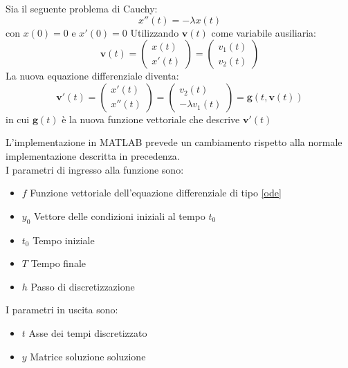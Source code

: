 \begin{example}
	Sia il seguente problema di Cauchy:
	\begin{equation*}
		x''(t) = -\lambda x(t)
	\end{equation*}
	con $x(0) = 0$ e $x'(0) = 0$
	Utilizzando $\textbf{v}(t)$ come variabile ausiliaria:
	\begin{equation*}
		\textbf{v}(t) = \begin{pmatrix}
			x(t) \\ x'(t)
		\end{pmatrix}
		= \begin{pmatrix}
			v_1(t) \\ v_2(t)
		\end{pmatrix}
	\end{equation*}
	La nuova equazione differenziale diventa:
	\begin{equation*}
		\textbf{v}'(t) = \begin{pmatrix}
			x'(t) \\ x''(t)
		\end{pmatrix}
		= \begin{pmatrix}
			v_2(t) \\ -\lambda v_1(t)
		\end{pmatrix}
	 	= \textbf{g}(t, \textbf{v}(t))
	\end{equation*}
	in cui $\textbf{g}(t)$ è la nuova funzione vettoriale che descrive $\textbf{v}'(t)$
\end{example}
L'implementazione in MATLAB prevede un cambiamento rispetto alla normale implementazione descritta in precedenza.
\\I parametri di ingresso alla funzione sono:
\begin{itemize}
	\item \textbf{$f$} Funzione vettoriale dell'equazione differenziale di tipo \ref{ode}
	\item \textbf{$y_0$} Vettore delle condizioni iniziali al tempo $t_0$
	\item \textbf{$t_0$} Tempo iniziale
	\item \textbf{$T$} Tempo finale
	\item \textbf{$h$} Passo di discretizzazione
\end{itemize}
I parametri in uscita sono:
\begin{itemize}
	\item \textbf{$t$} Asse dei tempi discretizzato
	\item \textbf{$y$} Matrice soluzione soluzione
\end{itemize} 
